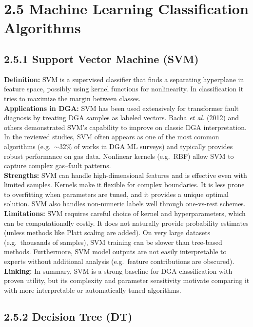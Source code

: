 \section{2.5 Machine Learning Classification
Algorithms}\label{machine-learning-classification-algorithms}

\subsection{2.5.1 Support Vector Machine
(SVM)}\label{support-vector-machine-svm}

\textbf{Definition:} SVM is a supervised classifier that finds a
separating hyperplane in feature space, possibly using kernel functions
for nonlinearity. In classification it tries to maximize the margin
between classes.\\
\textbf{Applications in DGA:} SVM has been used extensively for
transformer fault diagnosis by treating DGA samples as labeled vectors.
Bacha \emph{et al.} (2012) and others demonstrated SVM's capability to
improve on classic DGA interpretation. In the reviewed studies, SVM
often appears as one of the most common algorithms (e.g.~\(\sim\)32\% of works
in DGA ML surveys) and typically provides robust performance on gas
data. Nonlinear kernels (e.g.~RBF) allow SVM to capture complex
gas--fault patterns.\\
\textbf{Strengths:} SVM can handle high-dimensional features and is
effective even with limited samples. Kernels make it flexible for
complex boundaries. It is less prone to overfitting when parameters are
tuned, and it provides a unique optimal solution. SVM also handles
non-numeric labels well through one-vs-rest schemes.\\
\textbf{Limitations:} SVM requires careful choice of kernel and
hyperparameters, which can be computationally costly. It does not
naturally provide probability estimates (unless methods like Platt
scaling are added). On very large datasets (e.g.~thousands of samples),
SVM training can be slower than tree-based methods. Furthermore, SVM
model outputs are not easily interpretable to experts without additional
analysis (e.g.~feature contributions are obscured).\\
\textbf{Linking:} In summary, SVM is a strong baseline for DGA
classification with proven utility, but its complexity and parameter
sensitivity motivate comparing it with more interpretable or
automatically tuned algorithms.

\subsection{2.5.2 Decision Tree (DT)}\label{decision-tree-dt}

